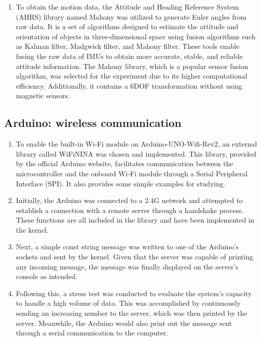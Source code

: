 \begin{enumerate}
	\item   To obtain the motion data, the Attitude and Heading Reference System (AHRS) library named Mahony was utilized to generate Euler angles from raw data.
	It is a set of algorithms designed to estimate the attitude and orientation of objects in three-dimensional space using fusion algorithms such as Kalman filter, Madgwick filter, and Mahony filter.
	These tools enable fusing the raw data of IMUs to obtain more accurate, stable, and reliable attitude information.
	The Mahony library, which is a popular sensor fusion algorithm, was selected for the experiment due to its higher computational efficiency.
	Additionally, it contains a 6DOF transformation without using magnetic sensors.

\end{enumerate}


\subsection{Arduino: wireless communication} \label{subsec:5g-network}
\begin{enumerate}
	\item   To enable the built-in Wi-Fi module on Arduino-UNO-Wifi-Rev2, an external library called WiFiNINA was chosen and implemented.
	This library, provided by the official Arduino website, facilitates communication between the microcontroller and the onboard Wi-Fi module through a Serial Peripheral Interface (SPI).
	It also provides some simple examples for studying.
	\item   Initially, the Arduino was connected to a 2.4G network and attempted to establish a connection with a remote server through a handshake process.
	These functions are all included in the library and have been implemented in the kernel.
	\item   Next, a simple const string message was written to one of the Arduino's sockets and sent by the kernel.
	Given that the server was capable of printing any incoming message, the message was finally displayed on the server's console as intended.
	\item   Following this, a stress test was conducted to evaluate the system's capacity to handle a high volume of data.
	This was accomplished by continuously sending an increasing number to the server, which was then printed by the server.
	Meanwhile, the Arduino would also print out the message sent through a serial communication to the computer.
\end{enumerate}


